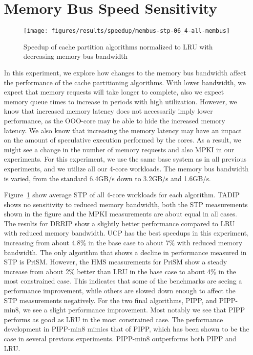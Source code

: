 \section{Memory Bus Speed Sensitivity}
\label{sec:results:bus_sensitivity}


\begin{figure}[t]
    \centering
    \texttt{[image: figures/results/speedup/membus-stp-06\_4-all-membus]}
    \caption[Speedup with decreasing bus bandwidth]{Speedup of cache partition algorithms normalized to LRU with decreasing memory bus bandwidth}
    \label{fig:results:bus}
\end{figure}

In this experiment, we explore how changes to the memory bus bandwidth affect the performance of the cache partitioning algorithms.
With lower bandwidth, we expect that memory requests will take longer to complete, also we expect memory queue times to increase in periods with high utilization.
However, we know that increased memory latency does not necessarily imply lower performance, as the OOO-core may be able to hide the increased memory latency.
We also know that increasing the memory latency may have an impact on the amount of speculative execution performed by the cores.
As a result, we might see a change in the number of memory requests and also MPKI in our experiments.
For this experiment, we use the same base system as in all previous experiments, and we utilize all our 4-core workloads.
The memory bus bandwidth is varied, from the standard 6.4GB/s down to 3.2GB/s and 1.6GB/s.

Figure~\ref{fig:results:bus} show average STP of all 4-core workloads for each algorithm.
TADIP shows no sensitivity to reduced memory bandwidth, both the STP measurements shown in the figure and the MPKI measurements are about equal in all cases.
The results for DRRIP show a slightly better performance compared to LRU with reduced memory bandwidth.
UCP has the best speedups in this experiment, increasing from about 4.8\% in the base case to about 7\% with reduced memory bandwidth.
The only algorithm that shows a decline in performance measured in STP is PriSM.
However, the HMS measurements for PriSM show a steady increase from about 2\% better than LRU in the base case to about 4\% in the most constrained case.
This indicates that some of the benchmarks are seeing a performance improvement, while others are slowed down enough to affect the STP measurements negatively.
For the two final algorithms, PIPP, and PIPP-min8, we see a slight performance improvement.
Most notably we see that PIPP performs as good as LRU in the most constrained case.
The performance development in PIPP-min8 mimics that of PIPP, which has been shown to be the case in several previous experiments.
PIPP-min8 outperforms both PIPP and LRU.


